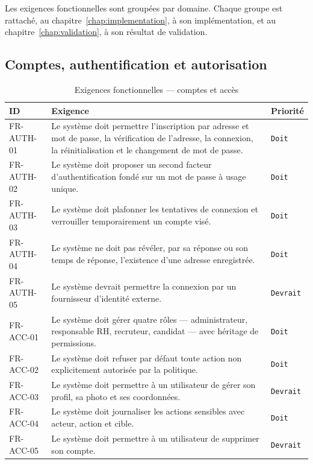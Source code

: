 Les exigences fonctionnelles sont groupées par domaine. Chaque groupe est
rattaché, au chapitre~\ref{chap:implementation}, à son implémentation, et au
chapitre~\ref{chap:validation}, à son résultat de validation.

\subsection{Comptes, authentification et autorisation}
\label{sec:fr_auth}

\begin{table}[htbp]
  \centering
  \caption{Exigences fonctionnelles — comptes et accès}
  \label{tab:fr_auth}
  \begin{tabularx}{\textwidth}{L{2.4cm} X L{1.9cm}}
    \toprule
    \textbf{ID} & \textbf{Exigence} & \textbf{Priorité} \\
    \midrule
    FR-AUTH-01 & Le système doit permettre l'inscription par adresse et mot de passe, la vérification de l'adresse, la connexion, la réinitialisation et le changement de mot de passe. & \texttt{Doit} \\
    FR-AUTH-02 & Le système doit proposer un second facteur d'authentification fondé sur un mot de passe à usage unique. & \texttt{Doit} \\
    FR-AUTH-03 & Le système doit plafonner les tentatives de connexion et verrouiller temporairement un compte visé. & \texttt{Doit} \\
    FR-AUTH-04 & Le système ne doit pas révéler, par sa réponse ou son temps de réponse, l'existence d'une adresse enregistrée. & \texttt{Doit} \\
    FR-AUTH-05 & Le système devrait permettre la connexion par un fournisseur d'identité externe. & \texttt{Devrait} \\
    FR-ACC-01  & Le système doit gérer quatre rôles — administrateur, responsable RH, recruteur, candidat — avec héritage de permissions. & \texttt{Doit} \\
    FR-ACC-02  & Le système doit refuser par défaut toute action non explicitement autorisée par la politique. & \texttt{Doit} \\
    FR-ACC-03  & Le système doit permettre à un utilisateur de gérer son profil, sa photo et ses coordonnées. & \texttt{Devrait} \\
    FR-ACC-04  & Le système doit journaliser les actions sensibles avec acteur, action et cible. & \texttt{Doit} \\
    FR-ACC-05  & Le système doit permettre à un utilisateur de supprimer son compte. & \texttt{Devrait} \\
    \bottomrule
  \end{tabularx}
\end{table}

